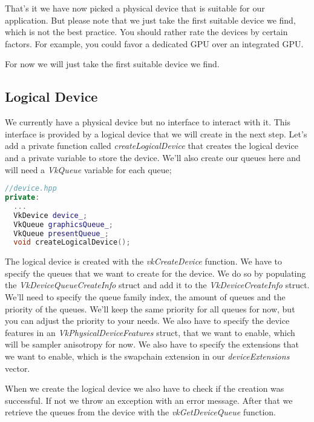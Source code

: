 \documentclass[12pt]{report} \usepackage{preamble}
\begin{document}
That's it we have now picked a physical device that is suitable for our application. But please note that
we just take the first suitable device we find, which is not the best practice. You should rather
rate the devices by certain factors. For example, you could favor a dedicated GPU over an integrated GPU.

For now we will just take the first suitable device we find.

\subsection{Logical Device}

We currently have a physical device but no interface to interact with it. This interface is provided
by a logical device that we will create in the next step. Let's add a private function called
\textit{createLogicalDevice} that creates the logical device and a private variable to store the device.
We'll also create our queues here and will need a \textit{VkQueue} variable for each queue;

\begin{lstlisting}[language=C++]
//device.hpp
private:
  ...
  VkDevice device_;
  VkQueue graphicsQueue_;
  VkQueue presentQueue_;
  void createLogicalDevice();
\end{lstlisting}

The logical device is created with the \textit{vkCreateDevice} function. We have to specify the
queues that we want to create for the device. We do so by populating the \textit{VkDeviceQueueCreateInfo}
struct and add it to the \textit{VkDeviceCreateInfo} struct. We'll need to specify the queue family index,
the amount of queues and the priority of the queues. We'll keep the same priority for all queues for now,
but you can adjust the priority to your needs. We also have to specify the device features in an
\textit{VkPhysicalDeviceFeatures} struct, that we want to enable, which will be sampler anisotropy for now.
We also have to specify the extensions that we want to enable,
which is the swapchain extension in our \textit{deviceExtensions} vector.

When we create the logical device we also have to check if the creation was successful. If not we throw
an exception with an error message. After that we retrieve the queues from the device with the
\textit{vkGetDeviceQueue} function.
\end{document}
